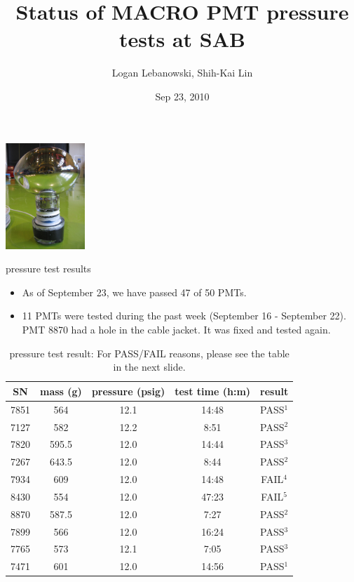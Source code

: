 \documentclass{beamer}
\begin{document}
\title{Status of MACRO PMT pressure tests at SAB}
\author{Logan Lebanowski, Shih-Kai Lin}
\date{Sep 23, 2010}

\begin{frame}
\begin{center}
\includegraphics[height=4cm]{IMG_1048.jpg}
\end{center}
\titlepage
\end{frame}


\begin{frame}{pressure test results}
\begin{itemize}
	\item As of September 23, we have passed 47 of 50 PMTs.
	\item 11 PMTs were tested during the past week (September 16 - September 22). PMT 8870
	had a hole in the cable jacket. It was fixed and tested again.
\end{itemize}
\begin{table}
\small
\begin{tabular}{c|c|c|c|c}
	SN & mass (g) & pressure (psig) & test time (h:m) & result \\
	\hline
	7851 & 564 & 12.1 & 14:48 & PASS$^1$ \\
	7127 & 582 & 12.2 & 8:51 & PASS$^2$ \\
	7820 & 595.5 & 12.0 & 14:44 & PASS$^3$ \\
	7267 & 643.5 & 12.0 & 8:44 & PASS$^2$ \\
	7934 & 609 & 12.0 & 14:48 & FAIL$^4$ \\
	8430 & 554 & 12.0 & 47:23 & FAIL$^5$ \\
	8870 & 587.5 & 12.0 & 7:27 & PASS$^2$ \\
	7899 & 566 & 12.0 & 16:24 & PASS$^3$ \\
	7765 & 573 & 12.1 & 7:05 & PASS$^3$ \\
	7471 & 601 & 12.0 & 14:56 & PASS$^1$ \\
\end{tabular}
\caption {pressure test result: For PASS/FAIL reasons, please see the table in the next slide.}
\end{table}
\end{frame}
\end{document}
